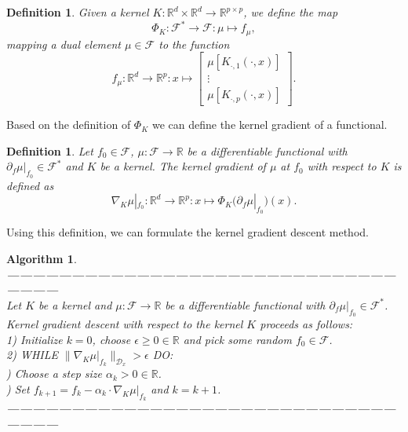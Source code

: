 \documentclass[11pt, a4paper]{article}
\newtheorem{definition}[theorem]{Definition}
\newtheorem{algorithm}[theorem]{Algorithm}
\newcommand{\R}{\mathds{R}}
\newcommand{\D}{\mathcal{D}}
\newcommand{\F}{\mathcal{F}}
\begin{document}
\begin{definition}
Given a kernel $K: \R^d \times \R^d \to \R^{p \times p}$, we define the map
\[ \Phi_K : \F^* \to \F : \mu \mapsto f_{\mu}, \]
mapping a dual element $\mu \in \F$ to the function
\[ f_{\mu} : \R^d \to \R^p : x \mapsto \begin{bmatrix} \mu [K_{\cdot,1}(\cdot,x) ] \\ \vdots \\ \mu [ K_{\cdot,p}(\cdot,x)] \end{bmatrix}. \]
\end{definition}

Based on the definition of $\Phi_K$ we can define the kernel gradient of a functional.

\begin{definition}
Let $f_0 \in \F$, $\mu : \F \to \R$ be a differentiable functional with $\partial_f\mu|_{f_0} \in \F^*$ and $K$ be a kernel. The kernel gradient of $\mu$ at $f_0$ with respect to $K$ is defined as
\[ \nabla_K\mu|_{f_0}: \R^d \to \R^p : x \mapsto \Phi_K \Big ( \partial_f\mu|_{f_0} \Big )(x). \]
\end{definition}

Using this definition, we can formulate the kernel gradient descent method.

\begin{algorithm}
\textbf{------------------------------------------------------------------------------------------------------} \\
Let $K$ be a kernel and $\mu: \F \to \R$ be a differentiable functional with $\partial_f\mu|_{f_0} \in \F^*$. Kernel gradient descent with respect to the kernel $K$ proceeds as follows: \\

1) Initialize $k=0$, choose $\epsilon \geq 0 \in \R$ and pick some random $f_0 \in \F$. \\

2) WHILE $ \big \| \nabla_K \mu|_{f_k} \big \|_{\D_x} > \epsilon $ DO:\\

) Choose a step size $\alpha_k > 0 \in \R$. \\

) Set $f_{k+1} = f_k - \alpha_k \cdot \nabla_K \mu|_{f_k}$ and $k = k+1$. \\
\textbf{------------------------------------------------------------------------------------------------------}
\end {algorithm}
\end{document}

